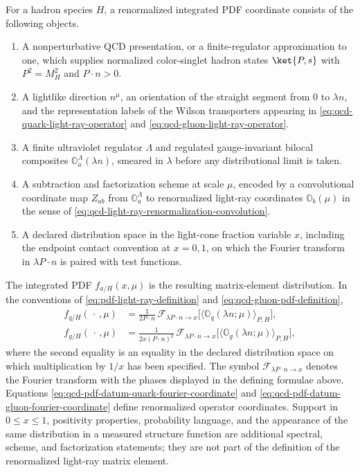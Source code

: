 \begin{definition}
\label{def:qcd-renormalized-integrated-pdf-datum}
For a hadron species \(H\), a renormalized integrated PDF coordinate consists of
the following objects.
\begin{enumerate}
  \item A nonperturbative QCD presentation, or a finite-regulator
  approximation to one, which supplies normalized color-singlet hadron states
  \(\ket{P,s}\) with \(P^2=M_H^2\) and \(P\cdot n>0\).
  \item A lightlike direction \(n^\mu\), an orientation of the straight
  segment from \(0\) to \(\lambda n\), and the representation labels of the
  Wilson transporters appearing in
  \eqref{eq:qcd-quark-light-ray-operator} and
  \eqref{eq:qcd-gluon-light-ray-operator}.
  \item A finite ultraviolet regulator \(\Lambda\) and regulated
  gauge-invariant bilocal composites
  \(\mathbb O_a^\Lambda(\lambda n)\), smeared in \(\lambda\) before any
  distributional limit is taken.
  \item A subtraction and factorization scheme at scale \(\mu\), encoded by
  a convolutional coordinate map \(Z_{ab}\) from
  \(\mathbb O_a^\Lambda\) to renormalized light-ray coordinates
  \(\mathbb O_b(\mu)\) in the sense of
  \eqref{eq:qcd-light-ray-renormalization-convolution}.
  \item A declared distribution space in the light-cone fraction variable
  \(x\), including the endpoint contact convention at \(x=0,1\), on which the
  Fourier transform in \(\lambda P\cdot n\) is paired with test functions.
\end{enumerate}
The integrated PDF \(f_{a/H}(x,\mu)\) is the resulting matrix-element
distribution.  In the conventions of
\eqref{eq:pdf-light-ray-definition} and
\eqref{eq:qcd-gluon-pdf-definition},
\begin{align}
  f_{q/H}(\,\cdot\,,\mu)
  &=
  \frac{1}{2P\cdot n}\,
  \mathcal F_{\lambda P\cdot n\to x}
  \bigl[\langle\mathbb O_q(\lambda n;\mu)\rangle_{P,H}\bigr],
  \label{eq:qcd-pdf-datum-quark-fourier-coordinate}\\
  f_{g/H}(\,\cdot\,,\mu)
  &=
  \frac{1}{2x(P\cdot n)^2}\,
  \mathcal F_{\lambda P\cdot n\to x}
  \bigl[\langle\mathbb O_g(\lambda n;\mu)\rangle_{P,H}\bigr],
  \label{eq:qcd-pdf-datum-gluon-fourier-coordinate}
\end{align}
where the second equality is an equality in the declared distribution space
on which multiplication by \(1/x\) has been specified.  The symbol
\(\mathcal F_{\lambda P\cdot n\to x}\) denotes the Fourier transform with
the phases displayed in the defining formulae above.  Equations
\eqref{eq:qcd-pdf-datum-quark-fourier-coordinate} and
\eqref{eq:qcd-pdf-datum-gluon-fourier-coordinate} define renormalized
operator coordinates.  Support in \(0\le x\le1\), positivity properties,
probability language, and the appearance of the same distribution in a
measured structure function are additional spectral, scheme, and
factorization statements; they are not part of the definition of the
renormalized light-ray matrix element.
\end{definition}

